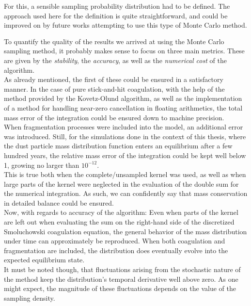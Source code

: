 For this, a sensible sampling probability distribution had to be defined. The approach used here 
for the definition is quite straightforward, and could be improved on by future works attempting 
to use this type of Monte Carlo method. 

\clearpage

To quantify the quality of the results we arrived at using the Monte Carlo sampling method, it 
probably makes sense to 
focus on three main metrics. These are given by the \textit{stability}, the \textit{accuracy}, 
as well as the \textit{numerical cost} of the algorithm. \\

As already mentioned, the first of these could be ensured in a satisfactory manner.
In the case of pure stick-and-hit coagulation, with the help of the method provided by the 
Kovetz-Olund algorithm, as well as the implementation of a method for handling near-zero
cancellation in floating arithmetics, the total mass error of the integration 
could be ensured down to machine precision. \\

When fragmentation processes were included into the model, an additional error was introduced.
Still, for the simulations done in the context of this thesis, where the dust 
particle mass distribution function enters an equilibrium after a few hundred years,
the relative mass error of the integration could be kept well below 1, growing no larger 
than $10^{-12}$. \\

This is true both when the complete/unsampled kernel was used, as well as when large parts of the 
kernel were neglected in the evaluation of the double sum for the numerical integration. As such,
we can confidently say that mass conservation in detailed balance could be ensured. \\

Now, with regards to accuracy of the algorithm:
Even when parts of the kernel are left out when evaluating the sum on the right-hand side of 
the discretized Smoluchowski coagulation equation, the general behavior of the mass distribution 
under time can approximately be reproduced. When both coagulation and fragmentation are included, 
the distribution does eventually evolve into the expected equilibrium state. \\

It must be noted though, 
that fluctuations arising from the stochastic nature of the method keep the distribution's temporal 
derivative well above zero. As one might expect, the magnitude of these fluctuations depends on the 
value of the sampling density. \\


